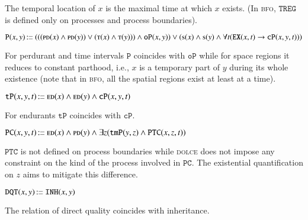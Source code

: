 \documentclass[ao]{iosart2x}
\newcommand{\nb}[1]{\textcolor{red}{$|$}\marginpar{\hspace*{-0cm}\parbox{20mm}{\scriptsize\raggedright\textcolor{red}{#1}}}}
\newcommand{\bfoAxLabel}{\textrm{a$_\texttt{b}$}}
\newcommand{\bdDefLabel}{\textrm{d$_\texttt{bd}$}}
\newcounter{cntbddf}
\newcommand{\bddf}[1]{\refstepcounter{cntbddf}\begin{small}{\bf \bdDefLabel\thecntbddf\label{#1}}\end{small}}
\newcommand{\refbfoax}[1]{({\bfoAxLabel}\ref{#1})}
\newcommand{\refbddf}[1]{({\bdDefLabel}\ref{#1})}
\newcommand{\pr}[1]{\mathtt{#1}}
\newcommand\textequal{%
 \rule[.08ex]{5pt}{0.35pt}\llap{\rule[.78ex]{5pt}{0.35pt}}}
\newcommand{\sdef}{{\hspace{1.5pt}:\hspace{-2.5pt}\textequal\hspace{3pt}}}
\newcommand{\dolce}{{\textsc{dolce}}}
\newcommand{\bfo}{{\textsc{bfo}}}
\newcommand {\EDdcat} {\textsc{ed}}
\newcommand {\PDdcat} {\textsc{pd}}
\newcommand {\PRdcat} {\textsc{pr}}
\newcommand {\Sdcat} {\textsc{s}}
\newcommand {\Tdcat} {\textsc{t}}
\newcommand {\TPd} {\ensuremath{\pr{tP}}}
\newcommand {\Pd} {\ensuremath{\pr{P}}}
\newcommand {\DQTd} {\ensuremath{\pr{DQT}}}
\newcommand {\PCd} {\ensuremath{\pr{PC}}}
\newcommand{\bfoisa}{\pr{ISA}}
\newcommand{\bfocpart}{\pr{cP}}
\newcommand{\bfoopart}{\pr{oP}}
\newcommand{\bfotpart}{\pr{tmP}}
\newcommand{\bfoexist}{\pr{EX}}
\newcommand{\bfoinh}{\pr{INH}}
\newcommand{\bfotregof}{\pr{TREG}}
\newcommand{\bfoparticin}{\pr{PTC}}
\begin{document}
\vspace{1pt}
The temporal location of $x$ is the maximal time at which $x$ exists. (In {\bfo}, $\bfotregof$ is defined only on processes and process boundaries). 


\item[\bddf{b2d_Pd}] $\Pd(x,y)\sdef (((\PDdcat(x) \land \PDdcat(y)) \lor (\Tdcat(x) \land \Tdcat(y))) \land \bfoopart(x,y)) \lor (\Sdcat(x) \land \Sdcat(y) \land \forall t(\bfoexist(x,t) \to \bfocpart(x,y,t)))$

\vspace{1pt}
For perdurant and time intervals $\Pd$ coincides with $\bfoopart$ while for space regions it reduces to constant parthood, i.e., $x$ is a temporary part of $y$ during its whole existence (note that in {\bfo}, all the spatial regions exist at least at a time). 

%
%

\item[\bddf{b2d_TPd}] $\TPd(x,y,t) \sdef \EDdcat(x) \land \EDdcat(y) \land \bfocpart(x,y,t)$

\vspace{1pt}
For endurants $\TPd$ coincides with $\bfocpart$. 

\item[\bddf{b2d_PCd}] $\PCd(x,y,t) \sdef \EDdcat(x) \land \PDdcat(y) \land \exists z(\bfotpart(y,z) \land \bfoparticin(x,z,t))$

\vspace{1pt}
$\bfoparticin$ is not defined on process boundaries while {\dolce} does not impose any constraint on the kind of the process involved in $\PCd$. The existential quantification on $z$ aims to mitigate this difference. 


\item[\bddf{b2d_DQTd}] $\DQTd(x,y) \sdef \bfoinh(x,y)$

\vspace{1pt}
The relation of direct quality coincides with inheritance. %
\end{document}
